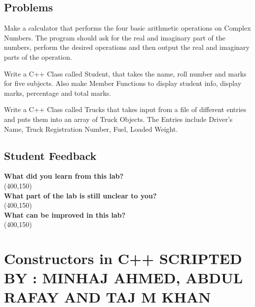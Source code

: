 \documentclass[11pt,fleqn]{book} %
\begin{document}
\newpage
\section{Problems}

\begin{problem} Make a calculator that performs the four basic arithmetic operations on Complex Numbers. The program should ask for the real and imaginary part of the numbers, perform the desired operations and then output the real and imaginary parts of the operation.\\
\end{problem} 

\begin{problem} Write a C++ Class called Student, that takes the name, roll number and marks for five subjects. Also make Member Functions to display student info, display marks, percentage and total marks.\\
\end{problem}

\begin{problem} Write a C++ Class called Trucks that takes input from a file of different entries and puts them into an array of Truck Objects. The Entries include Driver's Name, Truck Registration Number, Fuel, Loaded Weight.
\end{problem}

\newpage
\section{Student Feedback}
\textbf{What did you learn from this lab?}\\ 
\framebox(400,150){}\\
\textbf{What part of the lab is still unclear to you?}\\
\framebox(400,150){}\\
\textbf{What can be improved in this lab?}\\ 
\framebox(400,150){}\\

\newpage

\chapter{Constructors in C++ \hspace{36mm} {\textsc{\small SCRIPTED BY : MINHAJ AHMED, ABDUL RAFAY AND TAJ M KHAN}}}
\end{document}
